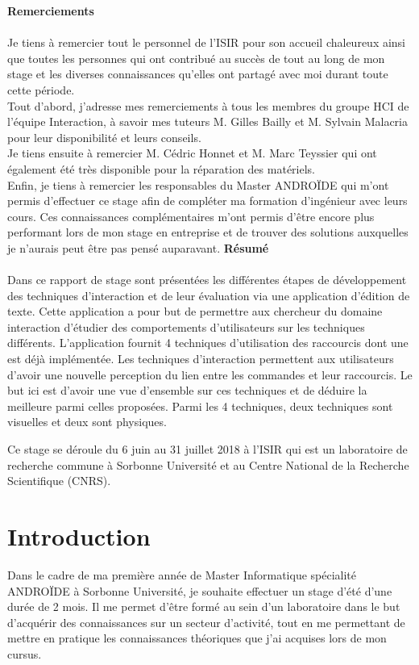 \documentclass[12pt,a4paper]{article}
\begin{document}
{\huge \textbf{Remerciements}}\\
\vspace{0.5cm}\\
Je tiens à remercier tout le personnel de l'ISIR pour son accueil
chaleureux ainsi que toutes les personnes qui ont contribué au succès de tout au long de mon stage et les diverses connaissances qu'elles ont partagé avec moi durant toute cette période.
\vspace{0.5cm}\\
Tout d'abord, j'adresse mes remerciements à tous les membres du groupe HCI de l'équipe Interaction, à savoir mes tuteurs M. Gilles Bailly et M. Sylvain Malacria pour leur disponibilité et leurs conseils.
\vspace{0.5cm}\\
Je tiens ensuite à remercier M. Cédric Honnet et M. Marc Teyssier qui ont également été très disponible pour la réparation des matériels.
\vspace{0.5cm}\\
Enfin, je tiens à remercier les responsables du Master ANDROÏDE qui m'ont permis d'effectuer ce stage afin de compléter ma formation d'ingénieur avec leurs cours. Ces connaissances complémentaires m'ont permis d'être encore plus performant lors de mon stage en entreprise et de trouver des
solutions auxquelles je n'aurais peut être pas pensé auparavant.
\newpage
{\huge \textbf{Résumé}}\\
\vspace{0.5cm}\\
Dans ce rapport de stage sont présentées les différentes étapes de développement des techniques d'interaction et de leur évaluation via une application d'édition de texte. Cette application a pour but de
permettre aux chercheur du domaine interaction d'étudier des comportements d'utilisateurs sur les techniques différents. L'application fournit 4 techniques d'utilisation des raccourcis dont une est déjà implémentée. Les techniques d'interaction permettent aux utilisateurs d'avoir une nouvelle perception du lien entre les commandes et leur raccourcis. Le but ici est d'avoir une vue d'ensemble sur ces techniques et de déduire la meilleure parmi celles proposées. Parmi les 4 techniques, deux techniques sont visuelles et deux sont physiques.

Ce stage se déroule du 6 juin au 31 juillet 2018 à l'ISIR qui est un laboratoire de recherche commune à Sorbonne Université et au Centre National de la Recherche Scientifique (CNRS).
\newpage
\tableofcontents
\newpage
\section{Introduction}
Dans le cadre de ma première année de Master Informatique spécialité ANDROÏDE à Sorbonne Université, je souhaite effectuer un stage d'été d'une durée de 2 mois. Il me permet d'être formé au sein d'un laboratoire dans le but d'acquérir des connaissances sur un secteur d'activité, tout en me permettant de mettre en pratique les connaissances théoriques que j'ai acquises lors de mon cursus.
\end{document}

